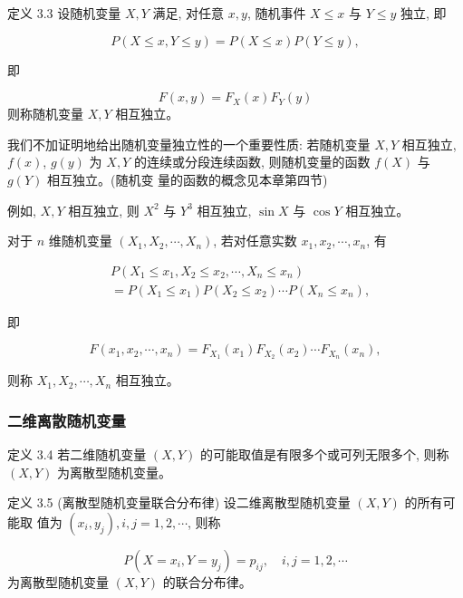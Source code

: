\documentclass{beamer}
\begin{document}
	\begin{frame}
		定义 3.3 设随机变量 $X, Y$ 满足, 对任意 $x, y$, 随机事件 $X \leqslant x$ 与 $Y \leqslant y$ 独立, 即
		
		$$
		P(X \leqslant x, Y \leqslant y)=P(X \leqslant x) P(Y \leqslant y),
		$$
		
		即
		
		$$
		F(x, y)=F_{X}(x) F_{Y}(y)
		$$
		则称随机变量 $X, Y$ 相互独立。
		
		我们不加证明地给出随机变量独立性的一个重要性质: 若随机变量 $X, Y$ 相互独立, $f(x)$, $g(y)$ 为 $X, Y$ 的连续或分段连续函数, 则随机变量的函数 $f(X)$ 与 $g(Y)$ 相互独立。(随机变 量的函数的概念见本章第四节)
		
		例如, $X, Y$ 相互独立, 则 $X^{2}$ 与 $Y^{3}$ 相互独立, $\sin X$ 与 $\cos Y$ 相互独立。
		
		对于 $n$ 维随机变量 $\left(X_{1}, X_{2}, \cdots, X_{n}\right)$, 若对任意实数 $x_{1}, x_{2}, \cdots, x_{n}$, 有
		
		
	\end{frame}
	
	\begin{frame}
		\begin{align}
			& P\left(X_{1} \leqslant x_{1}, X_{2} \leqslant x_{2}, \cdots, X_{n} \leqslant x_{n}\right) \\
			&=P\left(X_{1} \leqslant x_{1}\right) P\left(X_{2} \leqslant x_{2}\right) \cdots P\left(X_{n} \leqslant x_{n}\right),
		\end{align}
		
		
		
		即
		
		$$
		F\left(x_{1}, x_{2}, \cdots, x_{n}\right)=F_{X_{1}}\left(x_{1}\right) F_{X_{2}}\left(x_{2}\right) \cdots F_{X_{n}}\left(x_{n}\right),
		$$
		
		则称 $X_{1}, X_{2}, \cdots, X_{n}$ 相互独立。
	\end{frame}
	
	\begin{frame}
		\frametitle{二维离散随机变量}
		定义 3.4 若二维随机变量 $(X, Y)$ 的可能取值是有限多个或可列无限多个, 则称 $(X, Y)$ 为离散型随机变量。
		
		定义 3.5 (离散型随机变量联合分布律) 设二维离散型随机变量 $(X, Y)$ 的所有可能取 值为 $\left(x_{i}, y_{j}\right), i, j=1,2, \cdots$, 则称
		
		$$
		P\left(X=x_{i}, Y=y_{j}\right)=p_{i j}, \quad i, j=1,2, \cdots
		$$
		为离散型随机变量 $(X, Y)$ 的联合分布律。
	\end{frame}
	
\end{document}
